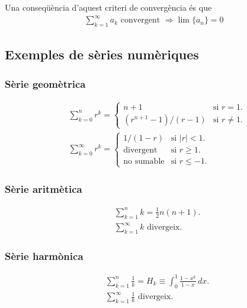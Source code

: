 Una conseqüència d'aquest criteri de convergència és que
\begin{align}
    \sum\limits_{k=1}^{\infty} a_{k} \text{ convergent } \Rightarrow \lim \{a_{n}\} = 0
\end{align}

\subsection{Exemples de sèries numèriques}
\subsubsection*{Sèrie geomètrica}
\begin{align} 
    & \sum\limits_{k=0}^{n} r^{k} = 
    \begin{cases} 
        n+1 & \text{si } r = 1. \\ 
        (r^{n+1} - 1)/(r - 1) & \text{si } r \neq 1. 
    \end{cases}  \\
    & \sum\limits_{k=0}^{\infty} r^{k} = 
    \begin{cases} 
        1/(1 - r) & \text{si } |r| < 1. \\ 
        \text{divergent} & \text{si } r \geq 1. \\ 
        \text{no sumable} & \text{si } r \leq -1. 
    \end{cases} 
\end{align}

\subsubsection*{Sèrie aritmètica}
\begin{align} 
    & \sum\limits_{k=1}^{n} k = \frac{1}{2} n (n+1). \\ 
    & \sum\limits_{k=1}^{\infty} k \text{ divergeix}.
\end{align}

\subsubsection*{Sèrie harmònica}
\begin{align} 
    & \sum\limits_{k=1}^{n} \frac{1}{k} = H_{k} \equiv \int_{0}^{1} \frac{1-x^{k}}{1-x} \, dx. \\
    & \sum\limits_{k=1}^{\infty} \frac{1}{k} \text{ divergeix}.
\end{align}

